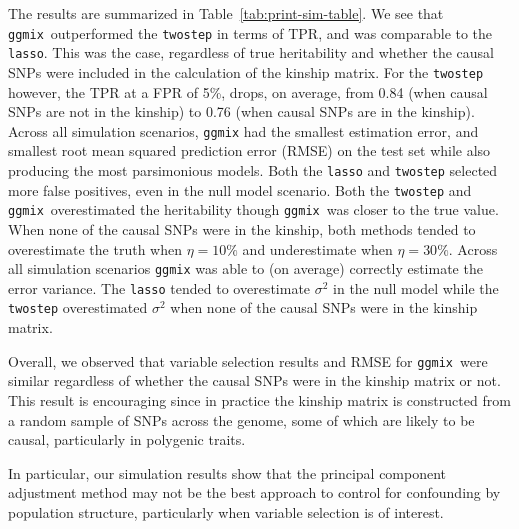 \documentclass[10pt,letterpaper]{article}
\newcommand{\ggmix}{\texttt{ggmix}}
\begin{document}
The results are summarized in Table~\ref{tab:print-sim-table}. We see that \ggmix ~outperformed the \texttt{twostep} in terms of TPR, and was comparable to the \texttt{lasso}. This was the case, regardless of true heritability and whether the causal SNPs were included in the calculation of the kinship matrix. For the \texttt{twostep} however, the TPR at a FPR of 5\%, drops, on average, from 0.84 (when causal SNPs are not in the kinship) to 0.76 (when causal SNPs are in the kinship). Across all simulation scenarios, \texttt{ggmix} had the smallest estimation error, and smallest root mean squared prediction error (RMSE) on the test set while also producing the most parsimonious models. Both the \texttt{lasso} and \texttt{twostep} selected more false positives, even in the null model scenario. Both the \texttt{twostep} and \ggmix ~overestimated the heritability though \ggmix ~was closer to the true value. When none of the causal SNPs were in the kinship, both methods tended to overestimate the truth when $\eta=10\%$ and underestimate when $\eta=30\%$. Across all simulation scenarios \texttt{ggmix} was able to (on average) correctly estimate the error variance. The \texttt{lasso} tended to overestimate $\sigma^2$ in the null model while the \texttt{twostep} overestimated $\sigma^2$ when none of the causal SNPs were in the kinship matrix. 

Overall, we observed that variable selection results and RMSE for \ggmix ~were similar regardless of whether the causal SNPs were in the kinship matrix or not.
This result is encouraging since in practice the kinship matrix is constructed from a random sample of SNPs across the genome, some of which are likely to be causal, particularly in polygenic traits. 

In particular, our simulation results show that the principal component adjustment method may not be the best approach to control for confounding by population structure, particularly when variable selection is of interest. 
\end{document}
